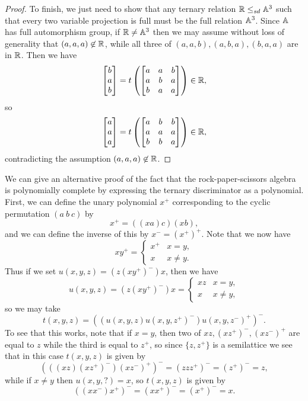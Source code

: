 \documentclass[letterpaper,11pt]{article}
\begin{document}
\begin{proof}
To finish, we just need to show that any ternary relation $\mathbb{R} \le_{sd} \mathbb{A}^3$ such that every two variable projection is full must be the full relation $\mathbb{A}^3$. Since $\mathbb{A}$ has full automorphism group, if $\mathbb{R} \ne \mathbb{A}^3$ then we may assume without loss of generality that $(a,a,a) \not\in \mathbb{R}$, while all three of $(a,a,b),(a,b,a),(b,a,a)$ are in $\mathbb{R}$. Then we have
\[
\begin{bmatrix} b\\ a\\ b\end{bmatrix} = t\left(\begin{bmatrix} a & a & b\\ a & b & a\\ b & a & a \end{bmatrix}\right) \in \mathbb{R},
\]
so
\[
\begin{bmatrix} a\\ a\\ a\end{bmatrix} = t\left(\begin{bmatrix} a & b & b\\ a & a & a\\ b & b & a \end{bmatrix}\right) \in \mathbb{R},
\]
contradicting the assumption $(a,a,a) \not\in \mathbb{R}$.
\end{proof}

\begin{ex} We can give an alternative proof of the fact that the rock-paper-scissors algebra is polynomially complete by expressing the ternary discriminator as a polynomial. First, we can define the unary polynomial $x^+$ corresponding to the cyclic permutation $(a\ b\ c)$ by
\[
x^+ = ((xa)c)(xb),
\]
and we can define the inverse of this by $x^- = (x^+)^+$.
Note that we now have
\[
xy^+ = \begin{cases} x^+ & x = y,\\ x & x\ne y.\end{cases}
\]
Thus if we set $u(x,y,z) = (z(xy^+)^-)x$, then we have
\[
u(x,y,z) = (z(xy^+)^-)x = \begin{cases} xz & x = y,\\ x & x \ne y,\end{cases}
\]
so we may take
\[
t(x,y,z) = ((u(x,y,z)u(x,y,z^+)^-)u(x,y,z^-)^+)^-.
\]
To see that this works, note that if $x=y$, then two of $xz, (xz^+)^-, (xz^-)^+$ are equal to $z$ while the third is equal to $z^+$, so since $\{z,z^+\}$ is a semilattice we see that in this case $t(x,y,z)$ is given by
\[
(((xz)(xz^+)^-)(xz^-)^+)^- = (zzz^+)^- = (z^+)^- = z,
\]
while if $x \ne y$ then $u(x,y,?) = x$, so $t(x,y,z)$ is given by
\[
((xx^-)x^+)^- = (xx^+)^- = (x^+)^- = x.
\]
\end{ex}
\end{document}
